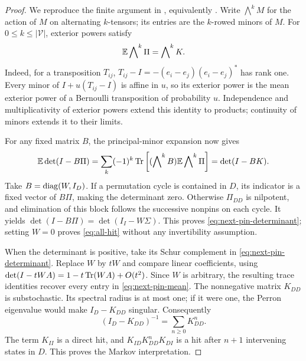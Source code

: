 \begin{proof}
We reproduce the finite argument in \cite[Lemma~2.6 and
Proposition~2.7]{BL}, equivalently \cite[Lemma~4.2 and
Proposition~4.3]{Ord}.  Write $\bigwedge^k M$ for the action of $M$
on alternating $k$-tensors; its entries are the $k$-rowed minors of $M$.
For $0\le k\le|\mathcal V|$, exterior powers satisfy
\begin{equation}\label{eq:exterior-moments}
                \mathbb E\bigwedge\nolimits^k\Pi
                          =\bigwedge\nolimits^k K.
\end{equation}
Indeed, for a transposition $T_{ij}$,
$T_{ij}-I=-(e_i-e_j)(e_i-e_j)^*$ has rank one.  Every minor of
$I+u(T_{ij}-I)$ is affine in $u$, so its exterior power is the
mean exterior power of a Bernoulli transposition of probability $u$.
Independence and multiplicativity of exterior powers extend this
identity to products; continuity of minors extends it to their limits.

For any fixed matrix $B$, the principal-minor expansion now gives
\begin{equation}\label{eq:det-mean}
 \mathbb E\det(I-B\Pi)
  =\sum_k(-1)^k\operatorname{Tr}\left[(\bigwedge\nolimits^k B)
                            \mathbb E\bigwedge\nolimits^k\Pi\right]
  =\det(I-BK).
\end{equation}
Take $B=\operatorname{diag}(W,I_D)$.  If a permutation cycle is contained in
$D$, its indicator is a fixed vector of $B\Pi$, making the determinant
zero.  Otherwise $\Pi_{DD}$ is nilpotent, and elimination of this
block follows the successive nonpins on each cycle.  It yields
$\det(I-B\Pi)=\det(I_I-W\Sigma)$.
This proves \eqref{eq:next-pin-determinant}; setting $W=0$ proves
\eqref{eq:all-hit} without any invertibility assumption.

When the determinant is positive, take its Schur complement in
\eqref{eq:next-pin-determinant}.  Replace $W$ by $tW$ and compare
linear coefficients, using
$\det(I-tWA)=1-t\operatorname{Tr}(WA)+O(t^2)$.  Since $W$ is arbitrary,
the resulting trace identities recover every entry in
\eqref{eq:next-pin-mean}.
The nonnegative matrix $K_{DD}$ is substochastic.  Its spectral radius
is at most one; if it were one, the Perron eigenvalue would make
$I_D-K_{DD}$ singular.  Consequently
\[
                  (I_D-K_{DD})^{-1}=\sum_{n\ge0}K_{DD}^n.
\]
The term $K_{II}$ is a direct hit, and
$K_{ID}K_{DD}^nK_{DI}$ is a hit after $n+1$ intervening states in
$D$.  This proves the Markov interpretation.
\end{proof}

